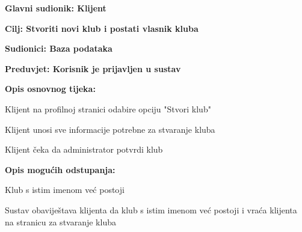 						\noindent {}
						\begin{packed_item}
							
							\item \textbf{Glavni sudionik: Klijent}
							\item  \textbf{Cilj: Stvoriti novi klub i postati vlasnik kluba} 
							\item  \textbf{Sudionici: Baza podataka}
							\item  \textbf{Preduvjet: Korisnik je prijavljen u sustav}
							\item  \textbf{Opis osnovnog tijeka: }
							
							\item[] \begin{packed_enum}
								
								\item Klijent na profilnoj stranici odabire opciju "Stvori klub"
								\item Klijent unosi sve informacije potrebne za stvaranje kluba
								\item Klijent čeka da administrator potvrdi klub

							\end{packed_enum}
						
							\item  \textbf{Opis mogućih odstupanja:}
							
							\item[] \begin{packed_item}
								
								\item[2.a] Klub s istim imenom već postoji
								\item[] \begin{packed_enum}
									
									\item Sustav obaviještava klijenta da klub s istim imenom već postoji i vraća klijenta na stranicu za stvaranje kluba
									
								\end{packed_enum}
								
								
								
							\end{packed_item}
							
							
						\end{packed_item}
					

